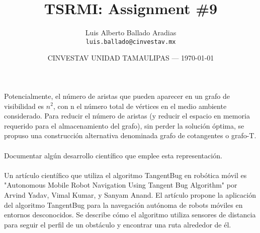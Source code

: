 \documentclass{article}
\title{TSRMI: Assignment \#9} %
\author{Luis Alberto Ballado Aradias\\ \texttt{luis.ballado@cinvestav.mx}} %
\date{CINVESTAV UNIDAD TAMAULIPAS --- \today} %
\begin{document}
\maketitle %



Potencialmente, el número de aristas que pueden aparecer en un grafo de visibilidad es $n^{2}$, con n el número total de vértices en el medio ambiente considerado. Para reducir el número de aristas (y reducir el espacio en memoria requerido para el almacenamiento del grafo), sin perder la solución óptima, se propuso una construcción alternativa denominada grafo de cotangentes o grafo-T. \\\\
Documentar algún desarrollo científico que emplee esta representación.\\\\

Un artículo científico que utiliza el algoritmo TangentBug en robótica móvil es "Autonomous Mobile Robot Navigation Using Tangent Bug Algorithm" por Arvind Yadav, Vimal Kumar, y Sanyam Anand. El artículo propone la aplicación del algoritmo TangentBug para la navegación autónoma de robots móviles en entornos desconocidos. Se describe cómo el algoritmo utiliza sensores de distancia para seguir el perfil de un obstáculo y encontrar una ruta alrededor de él.\\
\end{document}
